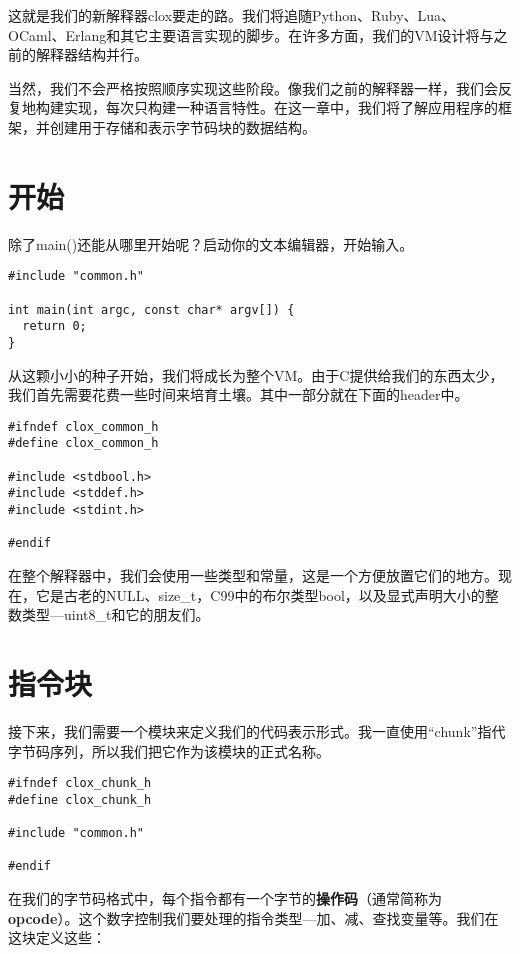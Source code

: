 \documentclass[cn,11pt,chinese]{elegantbook}
\begin{document}
这就是我们的新解释器clox要走的路。我们将追随Python、Ruby、Lua、OCaml、Erlang和其它主要语言实现的脚步。在许多方面，我们的VM设计将与之前的解释器结构并行。

当然，我们不会严格按照顺序实现这些阶段。像我们之前的解释器一样，我们会反复地构建实现，每次只构建一种语言特性。在这一章中，我们将了解应用程序的框架，并创建用于存储和表示字节码块的数据结构。

\section{开始}

除了main()还能从哪里开始呢？启动你的文本编辑器，开始输入。

\begin{verbatim}
#include "common.h"

int main(int argc, const char* argv[]) {
  return 0;
}
\end{verbatim}

从这颗小小的种子开始，我们将成长为整个VM。由于C提供给我们的东西太少，我们首先需要花费一些时间来培育土壤。其中一部分就在下面的header中。

\begin{verbatim}
#ifndef clox_common_h
#define clox_common_h

#include <stdbool.h>
#include <stddef.h>
#include <stdint.h>

#endif
\end{verbatim}

在整个解释器中，我们会使用一些类型和常量，这是一个方便放置它们的地方。现在，它是古老的NULL、size\_t，C99中的布尔类型bool，以及显式声明大小的整数类型—uint8\_t和它的朋友们。

\section{指令块}

接下来，我们需要一个模块来定义我们的代码表示形式。我一直使用“chunk”指代字节码序列，所以我们把它作为该模块的正式名称。

\begin{verbatim}
#ifndef clox_chunk_h
#define clox_chunk_h

#include "common.h"

#endif
\end{verbatim}

在我们的字节码格式中，每个指令都有一个字节的\textbf{操作码}（通常简称为\textbf{opcode}）。这个数字控制我们要处理的指令类型—加、减、查找变量等。我们在这块定义这些：
\end{document}
